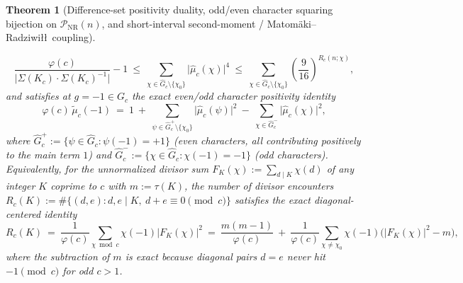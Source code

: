 \documentclass[11pt, a4paper]{article}
\theoremstyle{plain}
\newtheorem{theorem}{Theorem}[section]
\theoremstyle{definition}
\begin{document}
\begin{theorem}[Difference-set positivity duality, odd/even character squaring bijection on $\mathcal{P}_{\mathrm{NR}}(n)$, and short-interval second-moment / Matom\"{a}ki--Radziwi\l\l\ coupling]
\begin{enumerate}[(a)]
    \begin{equation}\label{eq:fourth_power_plancherel}
    \frac{\varphi(c)}{\big|\Sigma(K_c)\cdot\Sigma(K_c)^{-1}\big|}-1\ \le\ \sum_{\chi\in\widehat{G}_c\setminus\{\chi_0\}}\big|\widehat{\mu}_c(\chi)\big|^{4}\ \le\ \sum_{\chi\in\widehat{G}_c\setminus\{\chi_0\}}\left(\frac{9}{16}\right)^{R_c(n;\chi)},
    \end{equation}
    and satisfies at $g=-1\in G_c$ the exact even/odd character positivity identity
    \begin{equation}\label{eq:even_odd_positivity_identity}
    \varphi(c)\,\widetilde{\mu}_c(-1)\ =\ 1\ +\ \sum_{\psi\in\widehat{G}_c^{+}\setminus\{\chi_0\}}\big|\widehat{\mu}_c(\psi)\big|^{2}\ -\ \sum_{\chi\in\widehat{G}_c^{-}}\big|\widehat{\mu}_c(\chi)\big|^{2},
    \end{equation}
    where $\widehat{G}_c^{+}:=\{\psi\in\widehat{G}_c:\psi(-1)=+1\}$ (even characters, all contributing positively to the main term $1$) and $\widehat{G}_c^{-}:=\{\chi\in\widehat{G}_c:\chi(-1)=-1\}$ (odd characters). Equivalently, for the unnormalized divisor sum $F_K(\chi):=\sum_{d\mid K}\chi(d)$ of any integer $K$ coprime to $c$ with $m:=\tau(K)$, the number of divisor encounters $R_c(K):=\#\{(d,e):d,e\mid K,\ d+e\equiv 0\pmod c\}$ satisfies the exact diagonal-centered identity
    \begin{equation}\label{aud:centered}
    R_c(K)\ =\ \frac{1}{\varphi(c)}\sum_{\chi\bmod c}\chi(-1)\big|F_K(\chi)\big|^{2}\ =\ \frac{m(m-1)}{\varphi(c)}\ +\ \frac{1}{\varphi(c)}\sum_{\chi\ne\chi_0}\chi(-1)\Big(\big|F_K(\chi)\big|^{2}-m\Big),
    \end{equation}
    where the subtraction of $m$ is exact because diagonal pairs $d=e$ never hit $-1\pmod c$ for odd $c>1$.


\end{enumerate}
\end{theorem}
\end{document}
